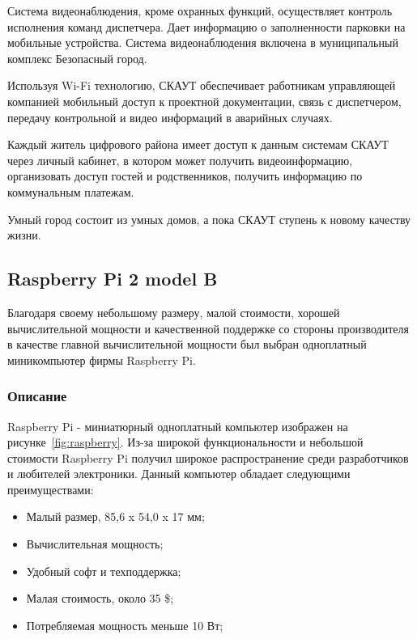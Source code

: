 Система видеонаблюдения, кроме охранных функций, осуществляет контроль исполнения команд диспетчера. Дает информацию о заполненности парковки на мобильные устройства. Система видеонаблюдения включена в муниципальный комплекс Безопасный город.

Используя Wi-Fi технологию, СКАУТ обеспечивает работникам управляющей компанией мобильный доступ к проектной документации, связь с диспетчером, передачу контрольной и видео информаций в аварийных случаях. 

Каждый житель цифрового района имеет доступ к данным системам СКАУТ через личный кабинет, в котором может получить видеоинформацию, организовать доступ гостей и родственников, получить информацию по коммунальным платежам. 

Умный город состоит из умных домов, а пока СКАУТ ступень к новому качеству жизни.

\subsection{Raspberry Pi 2 model B}

Благодаря своему небольшому размеру, малой стоимости, хорошей вычислительной мощности и качественной поддержке со стороны производителя в качестве главной вычислительной мощности был выбран одноплатный миникомпьютер фирмы Raspberry Pi. 

\subsubsection{Описание}

Raspberry Pi - миниатюрный одноплатный компьютер изображен на рисунке~\ref{fig:raspberry}. \cite{Raspberry} Из-за широкой функциональности и небольшой стоимости Raspberry Pi получил широкое распространение среди разработчиков и любителей электроники. Данный компьютер обладает следующими преимуществами:

\begin{itemize}
	\item Малый размер, 85,6 x 54,0 x 17 мм;
	\item Вычислительная мощность;
	\item Удобный софт и техподдержка;
	\item Малая стоимость, около 35 \$;
	\item Потребляемая мощность меньше 10 Вт;
\end{itemize}

